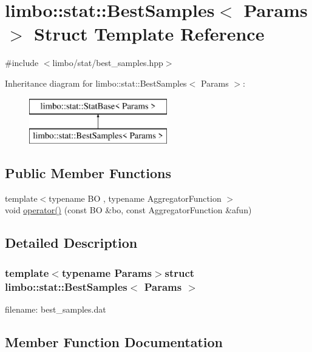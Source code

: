 \hypertarget{structlimbo_1_1stat_1_1_best_samples}{}\section{limbo\+:\+:stat\+:\+:Best\+Samples$<$ Params $>$ Struct Template Reference}
\label{structlimbo_1_1stat_1_1_best_samples}


{\ttfamily \#include $<$limbo/stat/best\+\_\+samples.\+hpp$>$}

Inheritance diagram for limbo\+:\+:stat\+:\+:Best\+Samples$<$ Params $>$\+:\begin{figure}[H]
\begin{center}
\leavevmode
\includegraphics[height=2.000000cm]{structlimbo_1_1stat_1_1_best_samples}
\end{center}
\end{figure}
\subsection*{Public Member Functions}
\begin{DoxyCompactItemize}
\item 
{\footnotesize template$<$typename B\+O , typename Aggregator\+Function $>$ }\\void \hyperlink{structlimbo_1_1stat_1_1_best_samples_a432216d8c0eaeca98226e500c304e5fa}{operator()} (const B\+O \&bo, const Aggregator\+Function \&afun)
\end{DoxyCompactItemize}


\subsection{Detailed Description}
\subsubsection*{template$<$typename Params$>$struct limbo\+::stat\+::\+Best\+Samples$<$ Params $>$}

filename\+: {\ttfamily best\+\_\+samples.\+dat} 

\subsection{Member Function Documentation}
\hypertarget{structlimbo_1_1stat_1_1_best_samples_a432216d8c0eaeca98226e500c304e5fa}{}
